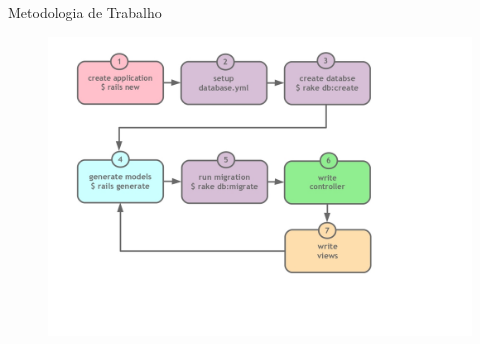 \begin{frame}[fragile,t]{Metodologia de Trabalho}
	\begin{figure}[h!]
		\centering
		\includegraphics[width=.9\textwidth]{imagens/metodologia-de-trabalho.jpg}
	\end{figure}
\end{frame}
